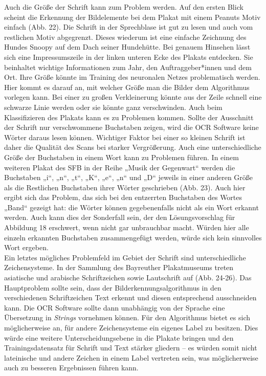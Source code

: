 \documentclass[a4paper,12pt,ngerman]{article}
\begin{document}
Auch die Größe der Schrift kann zum Problem werden. Auf den ersten Blick scheint die Erkennung der Bildelemente bei dem Plakat mit einem Peanuts Motiv einfach (Abb. 22). Die Schrift in der Sprechblase ist gut zu lesen und auch vom restlichen Motiv abgegrenzt. Dieses wiederum ist eine einfache Zeichnung des Hundes Snoopy auf dem Dach seiner Hundehütte. Bei genauem Hinsehen lässt sich eine Impressumszeile in der linken unteren Ecke des Plakats entdecken. Sie beinhaltet wichtige Informationen zum Jahr, den Auftraggeber*innen und dem Ort. Ihre Größe könnte im Training des neuronalen Netzes problematisch werden. Hier kommt es darauf an, mit welcher Größe man die Bilder dem Algorithmus vorlegen kann. Bei einer zu großen Verkleinerung könnte aus der Zeile schnell eine schwarze Linie werden oder sie könnte ganz verschwinden. Auch beim Klassifizieren des Plakats kann es zu Problemen kommen. Sollte der Ausschnitt der Schrift nur verschwommene Buchstaben zeigen, wird die OCR Software keine Wörter daraus lesen können. Wichtiger Faktor bei einer so kleinen Schrift ist daher die Qualität des Scans bei starker Vergrößerung. Auch eine unterschiedliche Größe der Buchstaben in einem Wort kann zu Problemen führen. In einem weiteren Plakat des SFB in der Reihe „Musik der Gegenwart“ werden die Buchstaben „i“, „n“, „t“, „K“, „e“, „n“ und „D“ jeweils in einer anderen Größe als die Restlichen Buchstaben ihrer Wörter geschrieben (Abb. 23). Auch hier ergibt sich das Problem, das sich bei den entzerrten Buchstaben des Wortes „Band“ gezeigt hat: die Wörter können gegebenenfalls nicht als ein Wort erkannt werden. Auch kann dies der Sonderfall sein, der den Lösungsvorschlag für Abbildung 18 erschwert, wenn nicht gar unbrauchbar macht. Würden hier alle einzeln erkannten Buchstaben zusammengefügt werden, würde sich kein sinnvolles Wort ergeben. \\
Ein letztes mögliches Problemfeld im Gebiet der Schrift sind unterschiedliche Zeichensysteme. In der Sammlung des Bayreuther Plakatmuseums treten asiatische und arabische Schriftzeichen sowie Lautschrift auf (Abb. 24-26). Das Hauptproblem sollte sein, dass der Bilderkennungsalgorithmus in den verschiedenen Schriftzeichen Text erkennt und diesen entsprechend ausschneiden kann. Die OCR Software sollte dann unabhängig von der Sprache eine Übersetzung in \textit{Strings} vornehmen können. Für den Algorithmus bietet es sich möglicherweise an, für andere Zeichensysteme ein eigenes Label zu besitzen. Dies würde eine weitere Unterscheidungsebene in die Plakate bringen und den Trainingsdatensatz für Schrift und Text stärker gliedern -- es würden somit nicht lateinische und andere Zeichen in einem Label vertreten sein, was möglicherweise auch zu besseren Ergebnissen führen kann. \\
\end{document}
